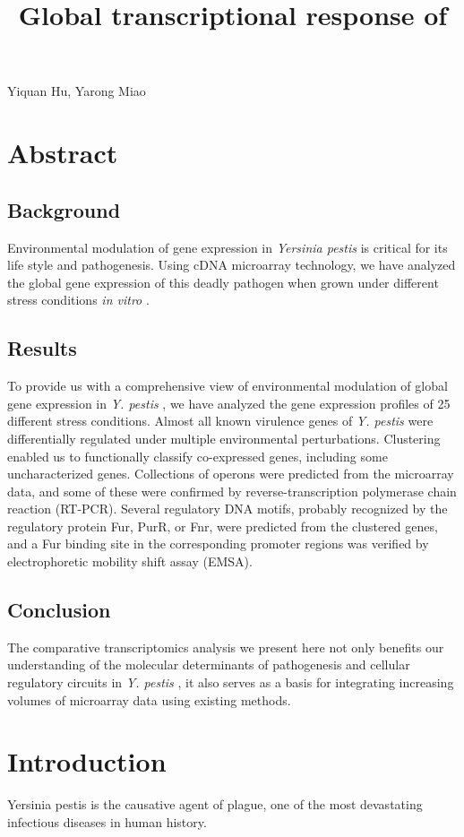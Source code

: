 \documentclass[11pt,a4paper]{article}
\title{Global transcriptional response of}
\begin{document}
\maketitle

Yiquan Hu, Yarong Miao

\section{Abstract}

\subsection{Background}

Environmental modulation of gene expression in \textit{Yersinia pestis} is critical for its life style and pathogenesis. Using cDNA microarray technology, we have analyzed the global gene expression of this deadly pathogen when grown under different stress conditions \textit{in vitro} .

\subsection{Results}

To provide us with a comprehensive view of environmental modulation of global gene expression in \textit{Y. pestis} , we have analyzed the gene expression profiles of 25 different stress conditions. Almost all known virulence genes of \textit{Y. pestis} were differentially regulated under multiple environmental perturbations. Clustering enabled us to functionally classify co-expressed genes, including some uncharacterized genes. Collections of operons were predicted from the microarray data, and some of these were confirmed by reverse-transcription polymerase chain reaction (RT-PCR). Several regulatory DNA motifs, probably recognized by the regulatory protein Fur, PurR, or Fnr, were predicted from the clustered genes, and a Fur binding site in the corresponding promoter regions was verified by electrophoretic mobility shift assay (EMSA).

\subsection{Conclusion}

The comparative transcriptomics analysis we present here not only benefits our understanding of the molecular determinants of pathogenesis and cellular regulatory circuits in \textit{Y. pestis} , it also serves as a basis for integrating increasing volumes of microarray data using existing methods.

\section{Introduction}

Yersinia pestis is the causative agent of plague, one of the most devastating infectious diseases in human history.
\end{document}
